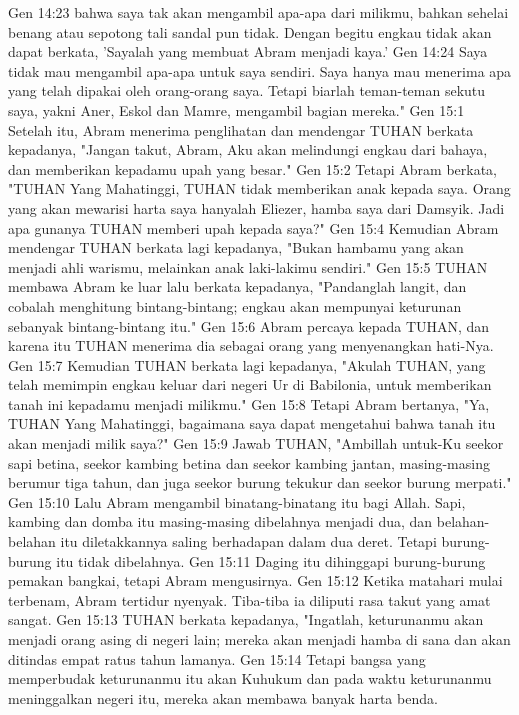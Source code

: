 Gen 14:23  bahwa saya tak akan mengambil apa-apa dari milikmu, bahkan sehelai benang atau sepotong tali sandal pun tidak. Dengan begitu engkau tidak akan dapat berkata, 'Sayalah yang membuat Abram menjadi kaya.'
Gen 14:24  Saya tidak mau mengambil apa-apa untuk saya sendiri. Saya hanya mau menerima apa yang telah dipakai oleh orang-orang saya. Tetapi biarlah teman-teman sekutu saya, yakni Aner, Eskol dan Mamre, mengambil bagian mereka."
Gen 15:1  Setelah itu, Abram menerima penglihatan dan mendengar TUHAN berkata kepadanya, "Jangan takut, Abram, Aku akan melindungi engkau dari bahaya, dan memberikan kepadamu upah yang besar."
Gen 15:2  Tetapi Abram berkata, "TUHAN Yang Mahatinggi, TUHAN tidak memberikan anak kepada saya. Orang yang akan mewarisi harta saya hanyalah Eliezer, hamba saya dari Damsyik. Jadi apa gunanya TUHAN memberi upah kepada saya?"
Gen 15:4  Kemudian Abram mendengar TUHAN berkata lagi kepadanya, "Bukan hambamu yang akan menjadi ahli warismu, melainkan anak laki-lakimu sendiri."
Gen 15:5  TUHAN membawa Abram ke luar lalu berkata kepadanya, "Pandanglah langit, dan cobalah menghitung bintang-bintang; engkau akan mempunyai keturunan sebanyak bintang-bintang itu."
Gen 15:6  Abram percaya kepada TUHAN, dan karena itu TUHAN menerima dia sebagai orang yang menyenangkan hati-Nya.
Gen 15:7  Kemudian TUHAN berkata lagi kepadanya, "Akulah TUHAN, yang telah memimpin engkau keluar dari negeri Ur di Babilonia, untuk memberikan tanah ini kepadamu menjadi milikmu."
Gen 15:8  Tetapi Abram bertanya, "Ya, TUHAN Yang Mahatinggi, bagaimana saya dapat mengetahui bahwa tanah itu akan menjadi milik saya?"
Gen 15:9  Jawab TUHAN, "Ambillah untuk-Ku seekor sapi betina, seekor kambing betina dan seekor kambing jantan, masing-masing berumur tiga tahun, dan juga seekor burung tekukur dan seekor burung merpati."
Gen 15:10  Lalu Abram mengambil binatang-binatang itu bagi Allah. Sapi, kambing dan domba itu masing-masing dibelahnya menjadi dua, dan belahan-belahan itu diletakkannya saling berhadapan dalam dua deret. Tetapi burung-burung itu tidak dibelahnya.
Gen 15:11  Daging itu dihinggapi burung-burung pemakan bangkai, tetapi Abram mengusirnya.
Gen 15:12  Ketika matahari mulai terbenam, Abram tertidur nyenyak. Tiba-tiba ia diliputi rasa takut yang amat sangat.
Gen 15:13  TUHAN berkata kepadanya, "Ingatlah, keturunanmu akan menjadi orang asing di negeri lain; mereka akan menjadi hamba di sana dan akan ditindas empat ratus tahun lamanya.
Gen 15:14  Tetapi bangsa yang memperbudak keturunanmu itu akan Kuhukum dan pada waktu keturunanmu meninggalkan negeri itu, mereka akan membawa banyak harta benda.
